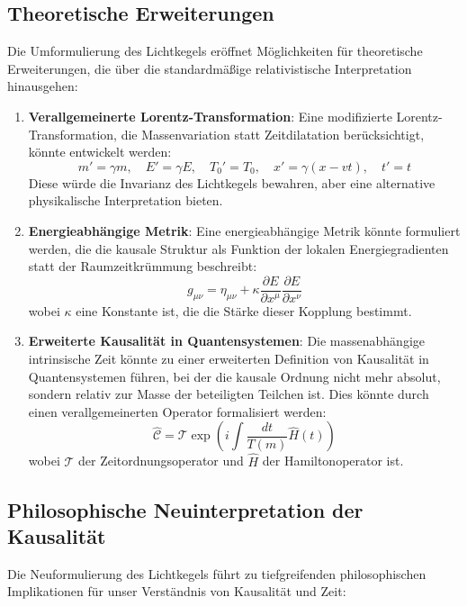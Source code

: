 \documentclass[a4paper,12pt]{article}
\begin{document}
	\subsection{Theoretische Erweiterungen}
	Die Umformulierung des Lichtkegels eröffnet Möglichkeiten für theoretische Erweiterungen, die über die standardmäßige relativistische Interpretation hinausgehen:
	
	\begin{enumerate}
		\item \textbf{Verallgemeinerte Lorentz-Transformation}: Eine modifizierte Lorentz-Transformation, die Massenvariation statt Zeitdilatation berücksichtigt, könnte entwickelt werden:
		\begin{equation}
			m' = \gamma m, \quad E' = \gamma E, \quad T_0' = T_0, \quad x' = \gamma(x - vt), \quad t' = t
		\end{equation}
		Diese würde die Invarianz des Lichtkegels bewahren, aber eine alternative physikalische Interpretation bieten.
		\item \textbf{Energieabhängige Metrik}: Eine energieabhängige Metrik könnte formuliert werden, die die kausale Struktur als Funktion der lokalen Energiegradienten statt der Raumzeitkrümmung beschreibt:
		\begin{equation}
			g_{\mu\nu} = \eta_{\mu\nu} + \kappa \frac{\partial E}{\partial x^\mu}\frac{\partial E}{\partial x^\nu}
		\end{equation}
		wobei \( \kappa \) eine Konstante ist, die die Stärke dieser Kopplung bestimmt.
		\item \textbf{Erweiterte Kausalität in Quantensystemen}: Die massenabhängige intrinsische Zeit könnte zu einer erweiterten Definition von Kausalität in Quantensystemen führen, bei der die kausale Ordnung nicht mehr absolut, sondern relativ zur Masse der beteiligten Teilchen ist. Dies könnte durch einen verallgemeinerten Operator formalisiert werden:
		\begin{equation}
			\hat{\mathcal{C}} = \mathcal{T} \exp\left(i\int \frac{dt}{T(m)} \hat{H}(t)\right)
		\end{equation}
		wobei \( \mathcal{T} \) der Zeitordnungsoperator und \( \hat{H} \) der Hamiltonoperator ist.
	\end{enumerate}
	
	\subsection{Philosophische Neuinterpretation der Kausalität}
	Die Neuformulierung des Lichtkegels führt zu tiefgreifenden philosophischen Implikationen für unser Verständnis von Kausalität und Zeit:
	
\end{document}
